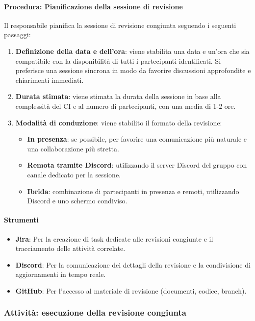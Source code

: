 \documentclass[a4paper,12pt]{article}
\begin{document}
\paragraph{Procedura: Pianificazione della sessione di revisione}
Il responsabile pianifica la sessione di revisione congiunta seguendo i
seguenti passaggi:
\begin{enumerate}
    \item \textbf{Definizione della data e dell'ora}: viene stabilita una data e un'ora che sia compatibile con la disponibilità di tutti i partecipanti identificati. Si preferisce una sessione sincrona in modo da favorire discussioni approfondite e chiarimenti immediati.
    \item \textbf{Durata stimata}: viene stimata la durata della sessione in base alla complessità del CI e al numero di partecipanti, con una media di 1-2 ore.
    \item \textbf{Modalità di conduzione}: viene stabilito il formato della revisione:
          \begin{itemize}
              \item \textbf{In presenza}: se possibile, per favorire una comunicazione più naturale e una collaborazione più stretta.
              \item \textbf{Remota tramite Discord}: utilizzando il server Discord del gruppo con canale dedicato per la sessione.
              \item \textbf{Ibrida}: combinazione di partecipanti in presenza e remoti, utilizzando Discord e uno schermo condiviso.
          \end{itemize}
\end{enumerate}

\paragraph{Strumenti}
\begin{itemize}
    \item \textbf{Jira}: Per la creazione di task dedicate alle revisioni congiunte e il tracciamento delle attività correlate.
    \item \textbf{Discord}: Per la comunicazione dei dettagli della revisione e la condivisione di aggiornamenti in tempo reale.
    \item \textbf{GitHub}: Per l'accesso al materiale di revisione (documenti, codice, branch).
\end{itemize}

\subsubsection{Attività: esecuzione della revisione congiunta}
\end{document}
